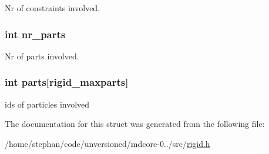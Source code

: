 Nr of constraints involved. \hypertarget{structrigid_ac4dd7e5fa976280ea5c88ef8206c2d5b}{
\subsubsection[{nr\-\_\-parts}]{\setlength{\rightskip}{0pt plus 5cm}int nr\-\_\-parts}}\label{structrigid_ac4dd7e5fa976280ea5c88ef8206c2d5b}
Nr of parts involved. \hypertarget{structrigid_a764d5dc0a8072ed017809e7820ae62a2}{
\subsubsection[{parts}]{\setlength{\rightskip}{0pt plus 5cm}int parts\mbox{[}{\bf rigid\-\_\-maxparts}\mbox{]}}}\label{structrigid_a764d5dc0a8072ed017809e7820ae62a2}
ids of particles involved 

The documentation for this struct was generated from the following file\-:\begin{DoxyCompactItemize}
\item 
/home/stephan/code/unversioned/mdcore-\/0../src/\hyperlink{rigid_8h}{rigid.\-h}\end{DoxyCompactItemize}
